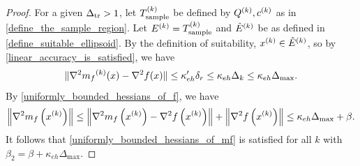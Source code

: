 \documentclass{article}
\begin{document}
\begin{proof}
For a given $\Delta_{\textrm{tr}} > 1$, let ${T_{\text{sample}}^{(k)}}$ be defined by ${Q^{(k)}}, c^{(k)}$ as in \cref{define_the_sample_region}.  Let ${E^{(k)}}={T_{\text{sample}}^{(k)}}$ and ${{\hat E}^{(k)}}$ be as defined in \cref{define_suitable_ellipsoid}.    By the definition of suitability, $x^{(k)} \in {{\hat E}^{(k)}}$, so by
\cref{linear_accuracy_is_satisfied}, we have  
\[\|\nabla^2 {{m}_f}^{(k)}(x) - \nabla^2 f(x)\| \le \kappa_{eh}'\delta_r \le \kappa_{eh} \Delta_k \le \kappa_{eh}\Delta_{\text{max}}.\]
By \cref{uniformly_bounded_hessians_of_f},  we have
\begin{align*}
\left\|\nabla^2 m_{f}\left(x^{(k)}\right)\right\| \le \left\|\nabla^2 m_{f}\left(x^{(k)}\right) - \nabla^2 f\left(x^{(k)}\right)  \right\| + \left\|\nabla^2 f\left(x^{(k)}\right) \right\|
\le \kappa_{eh}\Delta_{\text{max}} + \beta .
\end{align*}
It follows that \cref{uniformly_bounded_hessians_of_mf} is satisfied for all $k$ with $\beta_2 = \beta+\kappa_{eh}\Delta_{\text{max}}$.
\end{proof}

\end{document}
